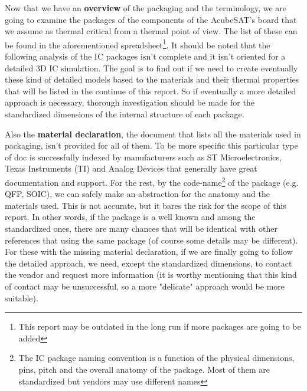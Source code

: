 \documentclass[final]{cubedoc}
\begin{document}


Now that we have an \textbf{overview} of the packaging and the terminology, we are going to examine the packages of the components of the AcubeSAT's board that we assume as thermal critical from a thermal point of view. The list of these can be found in the aforementioned spreadsheet\footnote{This report may be outdated in the long run if more packages are going to be added}. It should be noted that the following analysis of the IC packages isn't complete and it isn't oriented for a detailed 3D IC simulation. The goal is to find out if we need to create eventually these kind of detailed models based to the materials and their thermal properties that will be listed in the continue of this report. So if eventually a more detailed approach  is necessary, thorough investigation should be made for the standardized dimensions of the internal structure of each package. 

Also the \textbf{material declaration}, the document that lists all the materials used in packaging, isn't provided for all of them. To be more specific this particular type of doc is successfully indexed by manufacturers such as ST Microelectronics, Texas Instruments (TI) and Analog Devices that generally have great documentation and support. For the rest, by the code-name\footnote{The IC package naming convention is a function of the physical dimensions, pins, pitch and the overall anatomy of the package. Most of them are standardized but vendors may use different names} of the package (e.g. QFP, SOIC), we can safely make an abstraction for the anatomy and the materials used. This is not accurate, but it bares the risk for the scope of this report. In other words, if the package is a well known and among the standardized ones, there are many chances that will be identical with other references that using the same package (of course some details may be different). For these with the missing material declaration, if we are finally going to follow the detailed approach, we need, except the standardized dimensions, to contact the vendor and request more information (it is worthy mentioning that this kind of contact may be unsuccessful, so a more "delicate" approach would be more suitable). 
\end{document}

